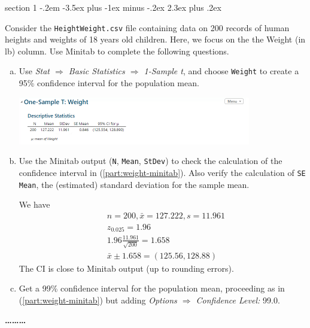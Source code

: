 \documentclass[answers,11pt]{exam}
\makeatletter
\newenvironment{problem}{\@startsection
       {section}
       {1}
       {-.2em}
       {-3.5ex plus -1ex minus -.2ex}
       {2.3ex plus .2ex}
       {\pagebreak[3]%
       \large\bf\noindent{Problem }
       }
       }
       {%
       \begin{center}\large\bf \ldots\ldots\ldots\end{center}}
\makeatother
\begin{document}
\begin{problem}{}

Consider the \texttt{HeightWeight.csv} file containing data on 200 records of human heights and weights of 18 years
old children. Here, we focus on the the Weight (in lb) column. Use Minitab to complete the following questions.

\begin{enumerate}[(a)]

\item \label{part:weight-minitab} Use \textit{Stat $\Rightarrow$ Basic Statistics $\Rightarrow$ 1-Sample
t}, and choose \texttt{Weight} to create a
95\% confidence interval for the population mean.

\begin{solution}
\begin{center}
\includegraphics[width=0.8\textwidth]{5a.png}
\end{center}
\end{solution}
\item Use the Minitab output (\texttt{N}, \texttt{Mean}, \texttt{StDev}) to check the calculation of the confidence
interval in (\ref{part:weight-minitab}).  Also verify the calculation
of \texttt{SE Mean}, the (estimated) standard deviation for the sample mean.
\begin{solution}
We have 
\begin{align*}
& n=200, \bar x = 127.222, s=11.961\\
& z_{0.025}=1.96 \\
& 1.96 \frac{11.961}{\sqrt{200}} = 1.658\\
& \bar x \pm 1.658 = (125.56, 128.88)
\end{align*}
The CI is close to Minitab output (up to rounding errors).
\end{solution}

\item \label{part:weight-confint-99} Get a 99\% confidence interval for the population mean, proceeding as in
(\ref{part:weight-minitab}) but adding \textit{Options $\Rightarrow$
Confidence Level:} 99.0.


\end{enumerate}
\end{problem}
\end{document}

